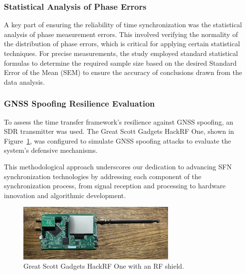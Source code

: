 \documentclass[12pt, a4paper]{extarticle}
\begin{document}
\subsubsection*{Statistical Analysis of Phase Errors}

A key part of ensuring the reliability of time synchronization was the
statistical analysis of phase measurement errors. This involved verifying the
normality of the distribution of phase errors, which is critical for applying
certain statistical techniques. For precise measurements, the study employed
standard statistical formulas to determine the required sample size based on
the desired Standard Error of the Mean (SEM) to ensure the accuracy of
conclusions drawn from the data analysis.

\subsubsection*{GNSS Spoofing Resilience Evaluation}

To assess the time transfer framework's resilience against GNSS spoofing, an
SDR transmitter was used. The Great Scott Gadgets HackRF One, shown in
Figure~\ref{fig:hackrf}, was configured to simulate GNSS spoofing attacks to
evaluate the system's defensive mechanisms.

This methodological approach underscores our dedication to advancing SFN
synchronization technologies by addressing each component of the
synchronization process, from signal reception and processing to hardware
innovation and algorithmic development.

\begin{figure}[h]
    \centering
    \includegraphics[width=0.7\textwidth]{hackrf.jpg}
    \caption{Great Scott Gadgets HackRF One with an RF shield.}
    \label{fig:hackrf}
\end{figure}
\end{document}
